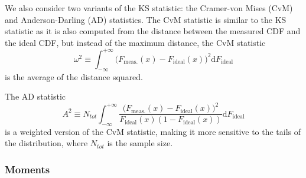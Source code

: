 We also consider two variants of the KS statistic: the Cramer-von Mises (CvM) and Anderson-Darling (AD) statistics.
The CvM statistic is similar to the KS statistic as it is also computed from the distance between the measured CDF and the ideal CDF, but instead of the maximum distance, the CvM statistic
\begin{equation}
\label{eq:cvm}
\omega^2 \equiv \int_{-\infty}^{+\infty}\big(F_{\mathrm{meas.}}(x) - F_{\mathrm{ideal}}(x)\big)^2\mathrm{d}F_{\mathrm{ideal}}
\end{equation}
is the average of the distance squared.

The AD statistic
\begin{equation} \label{eq:ad}
A^2 \equiv N_{tot}\int_{-\infty}^{+\infty} \frac{\big(F_{\mathrm{meas.}}(x) - F_{\mathrm{ideal}}(x)\big)^2} {F_{\mathrm{ideal}}(x) (1-F_{\mathrm{ideal}}(x))}\mathrm{d}F_{\mathrm{ideal}}
\end{equation}
is a weighted version of the CvM statistic, making it more sensitive to the tails of the distribution, where $N_{tot}$ is the sample size.

%


\subsubsection{Moments}
\label{sec:moments}

